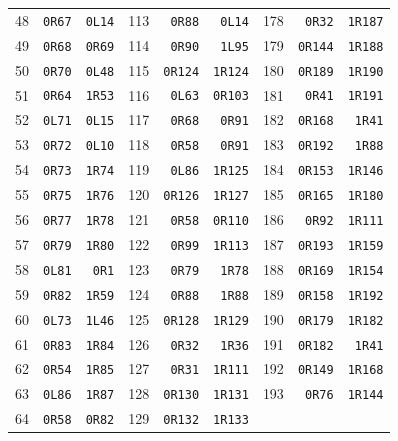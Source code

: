 \begin{center}
\begin{tabular}{rrr@{\hspace{17pt}}rrr@{\hspace{17pt}}rrr}
48 & \texttt{0R67} & \texttt{0L14} & 113 & \texttt{0R88} & \texttt{0L14} & 178 & \texttt{0R32} & \texttt{1R187}\\
49 & \texttt{0R68} & \texttt{0R69} & 114 & \texttt{0R90} & \texttt{1L95} & 179 & \texttt{0R144} & \texttt{1R188}\\
50 & \texttt{0R70} & \texttt{0L48} & 115 & \texttt{0R124} & \texttt{1R124} & 180 & \texttt{0R189} & \texttt{1R190}\\
51 & \texttt{0R64} & \texttt{1R53} & 116 & \texttt{0L63} & \texttt{0R103} & 181 & \texttt{0R41} & \texttt{1R191}\\
52 & \texttt{0L71} & \texttt{0L15} & 117 & \texttt{0R68} & \texttt{0R91} & 182 & \texttt{0R168} & \texttt{1R41}\\
53 & \texttt{0R72} & \texttt{0L10} & 118 & \texttt{0R58} & \texttt{0R91} & 183 & \texttt{0R192} & \texttt{1R88}\\
54 & \texttt{0R73} & \texttt{1R74} & 119 & \texttt{0L86} & \texttt{1R125} & 184 & \texttt{0R153} & \texttt{1R146}\\
55 & \texttt{0R75} & \texttt{1R76} & 120 & \texttt{0R126} & \texttt{1R127} & 185 & \texttt{0R165} & \texttt{1R180}\\
56 & \texttt{0R77} & \texttt{1R78} & 121 & \texttt{0R58} & \texttt{0R110} & 186 & \texttt{0R92} & \texttt{1R111}\\
57 & \texttt{0R79} & \texttt{1R80} & 122 & \texttt{0R99} & \texttt{1R113} & 187 & \texttt{0R193} & \texttt{1R159}\\
58 & \texttt{0L81} & \texttt{0R1} & 123 & \texttt{0R79} & \texttt{1R78} & 188 & \texttt{0R169} & \texttt{1R154}\\
59 & \texttt{0R82} & \texttt{1R59} & 124 & \texttt{0R88} & \texttt{1R88} & 189 & \texttt{0R158} & \texttt{1R192}\\
60 & \texttt{0L73} & \texttt{1L46} & 125 & \texttt{0R128} & \texttt{1R129} & 190 & \texttt{0R179} & \texttt{1R182}\\
61 & \texttt{0R83} & \texttt{1R84} & 126 & \texttt{0R32} & \texttt{1R36} & 191 & \texttt{0R182} & \texttt{1R41}\\
62 & \texttt{0R54} & \texttt{1R85} & 127 & \texttt{0R31} & \texttt{1R111} & 192 & \texttt{0R149} & \texttt{1R168}\\
63 & \texttt{0L86} & \texttt{1R87} & 128 & \texttt{0R130} & \texttt{1R131} & 193 & \texttt{0R76} & \texttt{1R144}\\
64 & \texttt{0R58} & \texttt{0R82} & 129 & \texttt{0R132} & \texttt{1R133} &  &  & \\
\bottomrule\end{tabular}\end{center}
